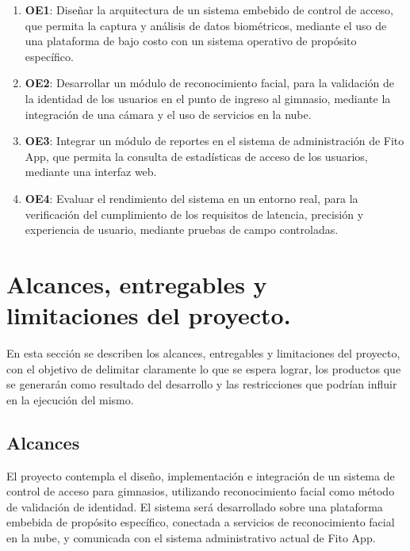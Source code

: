 \begin{enumerate}
    \item \textbf{OE1}: Diseñar la arquitectura de un sistema embebido de control de acceso, %
    que permita la captura y análisis de datos biométricos, mediante el uso de una plataforma de bajo costo con un sistema operativo de propósito específico.

    \item \textbf{OE2}: Desarrollar un módulo de reconocimiento facial, para la validación de la identidad de los usuarios en el punto de ingreso al gimnasio, mediante la integración de una cámara y el uso de servicios en la nube. %
    
    \item \textbf{OE3}: Integrar un módulo de reportes en el sistema de administración de Fito App, %
    que permita la consulta de estadísticas de acceso de los usuarios, mediante %
    una interfaz web.
    
    \item \textbf{OE4}: Evaluar el rendimiento del sistema en un entorno real, para la verificación del cumplimiento de los requisitos de latencia, precisión y experiencia de usuario, mediante pruebas de campo controladas. %

\end{enumerate}

\newpage
\section{Alcances, entregables y limitaciones del proyecto.}
En esta sección se describen los alcances, entregables y limitaciones del proyecto, con el objetivo de delimitar claramente lo que se espera lograr, los productos que se generarán como resultado del desarrollo y las restricciones que podrían influir en la ejecución del mismo.

\subsection{Alcances}
El proyecto contempla el diseño, implementación e integración de un sistema de control de acceso para gimnasios, utilizando reconocimiento facial como método de validación de identidad. El sistema será desarrollado sobre una plataforma embebida de propósito específico, conectada a servicios de reconocimiento facial en la nube, y comunicada con el sistema administrativo actual de Fito App.

